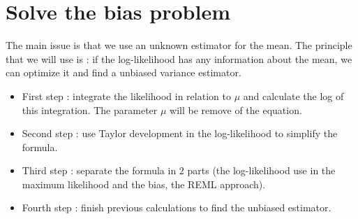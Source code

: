 \documentclass{article}
\begin{document}

\section{Solve the bias problem}
The main issue is that we use an unknown estimator for the mean. The principle that we will use is : if the log-likelihood has any information about the mean, we can optimize it and find a unbiased variance estimator.\\
\begin{itemize}
    \item First step : integrate the likelihood in relation to $\mu$ and calculate the log of this integration. The parameter $\mu$ will be remove of the equation.
    \item Second step : use Taylor development in the log-likelihood to simplify the formula. 
    \item Third step : separate the formula in $2$ parts (the log-likelihood use in the maximum likelihood and the bias, the REML approach).
    \item Fourth step : finish previous calculations to find the unbiased estimator.
\end{itemize}
\end{document}
